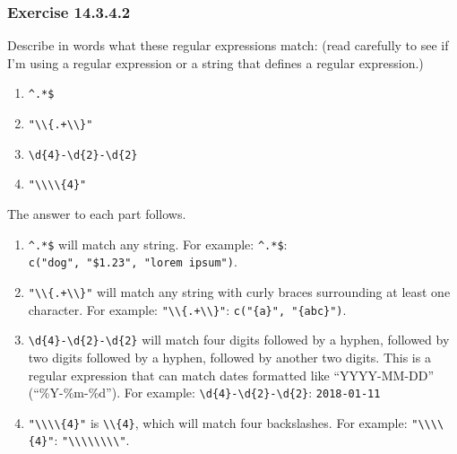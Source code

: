 \documentclass[]{book}
\providecommand{\tightlist}{%
  \setlength{\itemsep}{0pt}\setlength{\parskip}{0pt}}
\theoremstyle{plain}
\theoremstyle{remark}
\begin{document}
\hypertarget{exercise-14.3.4.2}{%
\subsubsection*{\texorpdfstring{Exercise
{14.3.4.2}}{Exercise 14.3.4.2}}\label{exercise-14.3.4.2}}

Describe in words what these regular expressions match: (read carefully
to see if I'm using a regular expression or a string that defines a
regular expression.)

\begin{enumerate}
\def\labelenumi{\arabic{enumi}.}
\tightlist
\item
  \texttt{\^{}.*\$}
\item
  \texttt{"\textbackslash{}\textbackslash{}\{.+\textbackslash{}\textbackslash{}\}"}
\item
  \texttt{\textbackslash{}d\{4\}-\textbackslash{}d\{2\}-\textbackslash{}d\{2\}}
\item
  \texttt{"\textbackslash{}\textbackslash{}\textbackslash{}\textbackslash{}\{4\}"}
\end{enumerate}

The answer to each part follows.

\begin{enumerate}
\def\labelenumi{\arabic{enumi}.}
\item
  \texttt{\^{}.*\$} will match any string. For example:
  \texttt{\^{}.*\$}: \texttt{c("dog",\ "\$1.23",\ "lorem\ ipsum")}.
\item
  \texttt{"\textbackslash{}\textbackslash{}\{.+\textbackslash{}\textbackslash{}\}"}
  will match any string with curly braces surrounding at least one
  character. For example:
  \texttt{"\textbackslash{}\textbackslash{}\{.+\textbackslash{}\textbackslash{}\}"}:
  \texttt{c("\{a\}",\ "\{abc\}")}.
\item
  \texttt{\textbackslash{}d\{4\}-\textbackslash{}d\{2\}-\textbackslash{}d\{2\}}
  will match four digits followed by a hyphen, followed by two digits
  followed by a hyphen, followed by another two digits. This is a
  regular expression that can match dates formatted like ``YYYY-MM-DD''
  (``\%Y-\%m-\%d''). For example:
  \texttt{\textbackslash{}d\{4\}-\textbackslash{}d\{2\}-\textbackslash{}d\{2\}}:
  \texttt{2018-01-11}
\item
  \texttt{"\textbackslash{}\textbackslash{}\textbackslash{}\textbackslash{}\{4\}"}
  is \texttt{\textbackslash{}\textbackslash{}\{4\}}, which will match
  four backslashes. For example:
  \texttt{"\textbackslash{}\textbackslash{}\textbackslash{}\textbackslash{}\{4\}"}:
  \texttt{"\textbackslash{}\textbackslash{}\textbackslash{}\textbackslash{}\textbackslash{}\textbackslash{}\textbackslash{}\textbackslash{}"}.
\end{enumerate}
\end{document}
